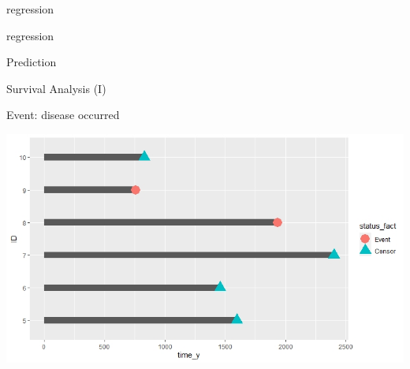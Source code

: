 \documentclass{beamer}
\begin{document}
	\begin{frame}{regression}
		
		
		
		
		
	\end{frame}
	
	\begin{frame}{regression}
		
		
		
	\end{frame}
	
	\begin{frame}{Prediction}
		
	\end{frame}
	
	\begin{frame}{Survival Analysis (I)}
		
		\vspace{0.3 cm}
		Event: disease occurred
		
		\begin{center}
			\includegraphics[width=0.9\columnwidth]{survival_plot2.jpeg}
		\end{center}
	\end{frame}
\end{document}
